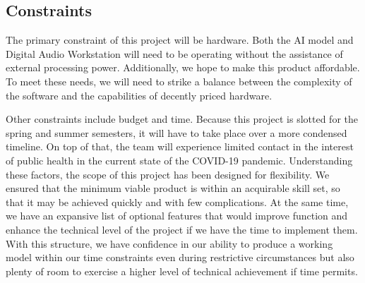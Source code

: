 \subsection{Constraints}
\label{sec:constraints}

The primary constraint of this project will be hardware. Both the AI model and Digital
Audio Workstation will need to be operating without the assistance of external
processing power. Additionally, we hope to make this product affordable. To meet
these needs, we will need to strike a balance between the complexity of the software
and the capabilities of decently priced hardware.

Other constraints include budget and time. Because this project is slotted for the spring and
summer semesters, it will have to take place over a more condensed timeline. On top of that, the
team will experience limited contact in the interest of public health in the current state of the
COVID-19 pandemic. Understanding these factors, the scope of this project has been designed for
flexibility. We ensured that the minimum viable product is within an acquirable skill set, so that
 it may be achieved quickly and with few complications. At the same time, we have an expansive list
  of optional features that would improve function and enhance the technical level of the project
  if we have the time to implement them. With this structure, we have confidence in our ability to
  produce a working model within our time constraints even during restrictive circumstances but
  also plenty of room to exercise a higher level of technical achievement if time permits.




